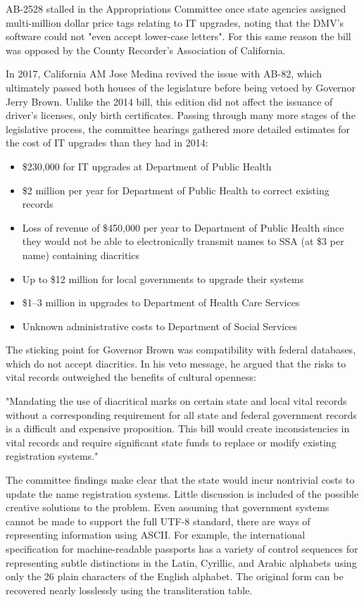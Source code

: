 AB-2528 stalled in the Appropriations Committee once state agencies assigned
multi-million dollar price tags relating to IT upgrades, noting that the DMV's
software could not "even accept lower-case letters". For this same reason the
bill was opposed by the County Recorder's Association of California.

In 2017, California AM Jose Medina revived the issue with AB-82, which
ultimately passed both houses of the legislature before being vetoed by Governor
Jerry Brown. Unlike the 2014 bill, this edition did not affect the issuance of
driver's licenses, only birth certificates. Passing through many more stages of
the legislative process, the committee hearings gathered more detailed estimates
for the cost of IT upgrades than they had in 2014:

\begin{itemize}

\item \$230,000 for IT upgrades at Department of Public Health
\item \$2 million per year for Department of Public Health to correct existing
records
\item Loss of revenue of \$450,000 per year to Department of Public Health since
they would not be able to electronically transmit names to SSA (at \$3 per name)
containing diacritics
\item Up to \$12 million for local governments to upgrade their systems
\item \$1--3 million in upgrades to Department of Health Care Services
\item Unknown administrative costs to Department of Social Services

\end{itemize}

The sticking point for Governor Brown was compatibility with federal databases,
which do not accept diacritics. In his veto message, he argued that the risks to
vital records outweighed the benefits of cultural openness:

"Mandating the use of diacritical marks on certain state and local vital records
without a corresponding requirement for all state and federal government records
is a difficult and expensive proposition. This bill would create inconsistencies
in vital records and require significant state funds to replace or modify
existing registration systems."

The committee findings make clear that the state would incur nontrivial costs to
update the name registration systems. Little discussion is included of the
possible creative solutions to the problem. Even assuming that government
systems cannot be made to support the full UTF-8 standard, there are ways of
representing information using ASCII. For example, the international
specification for machine-readable passports has a variety of control sequences
for representing subtle distinctions in the Latin, Cyrillic, and Arabic
alphabets using only the 26 plain characters of the English alphabet.  The
original form can be recovered nearly losslessly using the transliteration
table.

